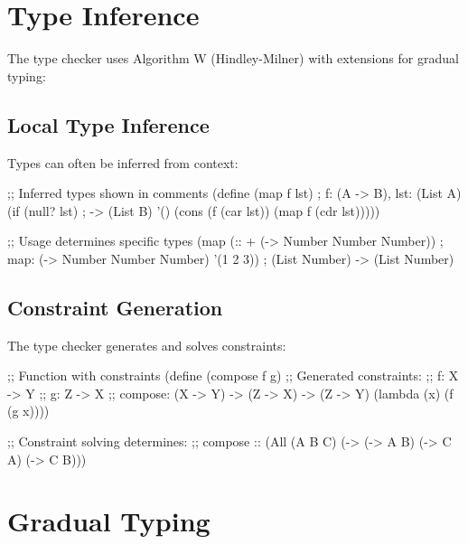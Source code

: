 \section{Type Inference}
\label{sec:inference}


The type checker uses Algorithm W (Hindley-Milner) with extensions for gradual typing:

\subsection{Local Type Inference}
\label{subsec:local-inference}

Types can often be inferred from context:

\begin{example}
\begin{lambdustcode}
;; Inferred types shown in comments
(define (map f lst)                    ; f: (A -> B), lst: (List A)
  (if (null? lst)                      ; -> (List B)
      '()
      (cons (f (car lst)) 
            (map f (cdr lst)))))

;; Usage determines specific types  
(map (:: + (-> Number Number Number))  ; map: (-> Number Number Number)
     '(1 2 3))                         ;      (List Number) -> (List Number)
\end{lambdustcode}
\end{example}

\subsection{Constraint Generation}
\label{subsec:constraints}

The type checker generates and solves constraints:

\begin{example}
\begin{lambdustcode}
;; Function with constraints
(define (compose f g)
  ;; Generated constraints:
  ;; f: X -> Y  
  ;; g: Z -> X
  ;; compose: (X -> Y) -> (Z -> X) -> (Z -> Y)
  (lambda (x) (f (g x))))

;; Constraint solving determines:
;; compose :: (All (A B C) (-> (-> A B) (-> C A) (-> C B)))
\end{lambdustcode}
\end{example}

\section{Gradual Typing}
\label{sec:gradual}


